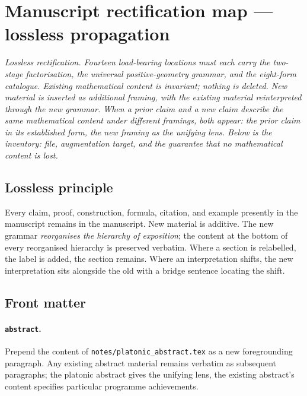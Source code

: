 
\providecommand{\kBKM}{\kappa_{\mathrm{BKM}}}
\providecommand{\kch}{\kappa_{\mathrm{ch}}}
\providecommand{\kcat}{\kappa_{\mathrm{cat}}}
\providecommand{\kfib}{\kappa_{\mathrm{fiber}}}

\section*{Manuscript rectification map --- lossless propagation}
\label{wn:sec:manuscript-rectification-map}

\emph{Lossless rectification. Fourteen load-bearing locations must
each carry the two-stage factorisation, the universal positive-geometry
grammar, and the eight-form catalogue. Existing mathematical content
is invariant; nothing is deleted. New material is inserted as
additional framing, with the existing material reinterpreted through
the new grammar. When a prior claim and a new claim describe the
same mathematical content under different framings, both appear:
the prior claim in its established form, the new framing as the
unifying lens. Below is the inventory: file, augmentation target,
and the guarantee that no mathematical content is lost.}

\subsection*{Lossless principle}

Every claim, proof, construction, formula, citation, and example
presently in the manuscript remains in the manuscript. New
material is additive. The new grammar \emph{reorganises the
hierarchy of exposition}; the content at the bottom of every
reorganised hierarchy is preserved verbatim. Where a section is
relabelled, the label is added, the section remains. Where an
interpretation shifts, the new interpretation sits alongside the
old with a bridge sentence locating the shift.

\subsection*{Front matter}

\paragraph{\texttt{abstract}.} Prepend the content of
\texttt{notes/platonic\_abstract.tex} as a new foregrounding
paragraph. Any existing abstract material remains verbatim as
subsequent paragraphs; the platonic abstract gives the unifying
lens, the existing abstract's content specifies particular
programme achievements.

